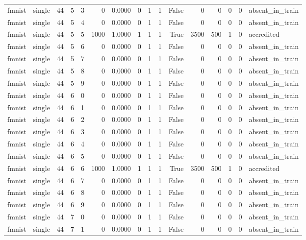 \begin{tabular}{llrrrrrrrrrrrrrl}
fmnist & single & 44 & 5 & 3 & 0 & 0.0000 & 0 & 1 & 1 & False & 0 & 0 & 0 & 0 & absent\_in\_train \\
fmnist & single & 44 & 5 & 4 & 0 & 0.0000 & 0 & 1 & 1 & False & 0 & 0 & 0 & 0 & absent\_in\_train \\
fmnist & single & 44 & 5 & 5 & 1000 & 1.0000 & 1 & 1 & 1 & True & 3500 & 500 & 1 & 0 & accredited \\
fmnist & single & 44 & 5 & 6 & 0 & 0.0000 & 0 & 1 & 1 & False & 0 & 0 & 0 & 0 & absent\_in\_train \\
fmnist & single & 44 & 5 & 7 & 0 & 0.0000 & 0 & 1 & 1 & False & 0 & 0 & 0 & 0 & absent\_in\_train \\
fmnist & single & 44 & 5 & 8 & 0 & 0.0000 & 0 & 1 & 1 & False & 0 & 0 & 0 & 0 & absent\_in\_train \\
fmnist & single & 44 & 5 & 9 & 0 & 0.0000 & 0 & 1 & 1 & False & 0 & 0 & 0 & 0 & absent\_in\_train \\
fmnist & single & 44 & 6 & 0 & 0 & 0.0000 & 0 & 1 & 1 & False & 0 & 0 & 0 & 0 & absent\_in\_train \\
fmnist & single & 44 & 6 & 1 & 0 & 0.0000 & 0 & 1 & 1 & False & 0 & 0 & 0 & 0 & absent\_in\_train \\
fmnist & single & 44 & 6 & 2 & 0 & 0.0000 & 0 & 1 & 1 & False & 0 & 0 & 0 & 0 & absent\_in\_train \\
fmnist & single & 44 & 6 & 3 & 0 & 0.0000 & 0 & 1 & 1 & False & 0 & 0 & 0 & 0 & absent\_in\_train \\
fmnist & single & 44 & 6 & 4 & 0 & 0.0000 & 0 & 1 & 1 & False & 0 & 0 & 0 & 0 & absent\_in\_train \\
fmnist & single & 44 & 6 & 5 & 0 & 0.0000 & 0 & 1 & 1 & False & 0 & 0 & 0 & 0 & absent\_in\_train \\
fmnist & single & 44 & 6 & 6 & 1000 & 1.0000 & 1 & 1 & 1 & True & 3500 & 500 & 1 & 0 & accredited \\
fmnist & single & 44 & 6 & 7 & 0 & 0.0000 & 0 & 1 & 1 & False & 0 & 0 & 0 & 0 & absent\_in\_train \\
fmnist & single & 44 & 6 & 8 & 0 & 0.0000 & 0 & 1 & 1 & False & 0 & 0 & 0 & 0 & absent\_in\_train \\
fmnist & single & 44 & 6 & 9 & 0 & 0.0000 & 0 & 1 & 1 & False & 0 & 0 & 0 & 0 & absent\_in\_train \\
fmnist & single & 44 & 7 & 0 & 0 & 0.0000 & 0 & 1 & 1 & False & 0 & 0 & 0 & 0 & absent\_in\_train \\
fmnist & single & 44 & 7 & 1 & 0 & 0.0000 & 0 & 1 & 1 & False & 0 & 0 & 0 & 0 & absent\_in\_train \\

\end{tabular}
